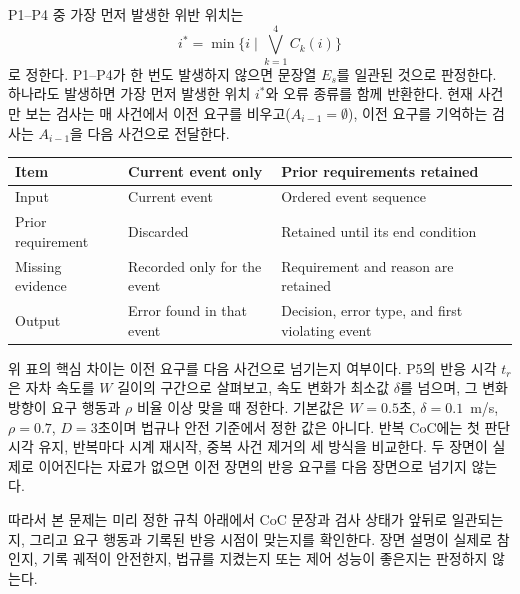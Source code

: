 P1--P4 중 가장 먼저 발생한 위반 위치는
\begin{equation}
i^*=\min\{i\mid\bigvee_{k=1}^{4}C_k(i)\}
\end{equation}
로 정한다. P1--P4가 한 번도 발생하지 않으면 문장열 $E_s$를 일관된 것으로 판정한다. 하나라도 발생하면 가장 먼저 발생한 위치 $i^*$와 오류 종류를 함께 반환한다. 현재 사건만 보는 검사는 매 사건에서 이전 요구를 비우고($A_{i-1}=\emptyset$), 이전 요구를 기억하는 검사는 $A_{i-1}$을 다음 사건으로 전달한다.

\begin{table}[t]
\centering
{}
\label{tab:event-vs-stateful}
\footnotesize
\begin{tabularx}{\columnwidth}{L{0.29\columnwidth}YY}
\toprule
Item & Current event only & Prior requirements retained \\
\midrule
Input & Current event & Ordered event sequence \\
Prior requirement & Discarded & Retained until its end condition \\
Missing evidence & Recorded only for the event & Requirement and reason are retained \\
Output & Error found in that event & Decision, error type, and first violating event \\
\bottomrule
\end{tabularx}
\end{table}

위 표의 핵심 차이는 이전 요구를 다음 사건으로 넘기는지 여부이다. P5의 반응 시각 $t_r$은 자차 속도를 $W$ 길이의 구간으로 살펴보고, 속도 변화가 최소값 $\delta$를 넘으며, 그 변화 방향이 요구 행동과 $\rho$ 비율 이상 맞을 때 정한다. 기본값은 $W=0.5$초, $\delta=0.1$~m/s, $\rho=0.7$, $D=3$초이며 법규나 안전 기준에서 정한 값은 아니다. 반복 CoC에는 첫 판단 시각 유지, 반복마다 시계 재시작, 중복 사건 제거의 세 방식을 비교한다. 두 장면이 실제로 이어진다는 자료가 없으면 이전 장면의 반응 요구를 다음 장면으로 넘기지 않는다.

따라서 본 문제는 미리 정한 규칙 아래에서 CoC 문장과 검사 상태가 앞뒤로 일관되는지, 그리고 요구 행동과 기록된 반응 시점이 맞는지를 확인한다. 장면 설명이 실제로 참인지, 기록 궤적이 안전한지, 법규를 지켰는지 또는 제어 성능이 좋은지는 판정하지 않는다.
